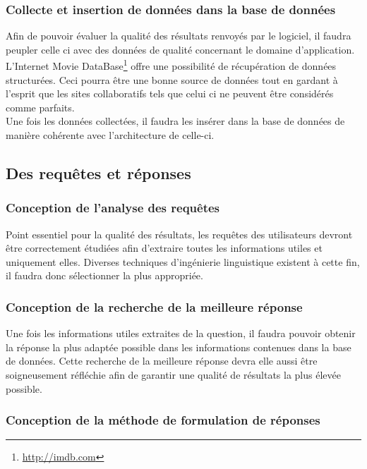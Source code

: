 \documentclass[a4paper,12pt]{article}
\begin{document}
\subsubsection{Collecte et insertion de données dans la base de données}
Afin de pouvoir évaluer la qualité des résultats renvoyés par le logiciel, il faudra peupler celle ci avec des données de qualité concernant le domaine d'application.
L'Internet Movie DataBase\footnote{\url{http://imdb.com}} offre une possibilité de récupération de données structurées.
Ceci pourra être une bonne source de données tout en gardant à l'esprit que les sites collaboratifs tels que celui ci ne peuvent être considérés comme parfaits. \\

Une fois les données collectées, il faudra les insérer dans la base de données de manière cohérente avec l'architecture de celle-ci.
\subsection{Des requêtes et réponses}
\subsubsection{Conception de l'analyse des requêtes}
Point essentiel pour la qualité des résultats, les requêtes des utilisateurs devront être correctement étudiées afin d'extraire toutes les informations utiles et uniquement elles.
Diverses techniques d'ingénierie linguistique existent à cette fin, il faudra donc sélectionner la plus appropriée. 
\subsubsection{Conception de la recherche de la meilleure réponse}
Une fois les informations utiles extraites de la question, il faudra pouvoir obtenir la réponse la plus adaptée possible dans les informations contenues dans la base de données.
Cette recherche de la meilleure réponse devra elle aussi être soigneusement réfléchie afin de garantir une qualité de résultats la plus élevée possible.
\subsubsection{Conception de la méthode de formulation de réponses}
\end{document}
